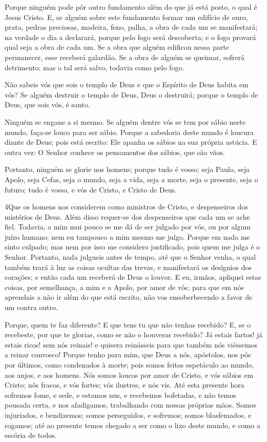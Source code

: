 Porque ninguém pode pôr outro fundamento além do que já está
posto, o qual é Jesus Cristo. E, se alguém sobre este
fundamento formar um edifício de ouro, prata, pedras preciosas,
madeira, feno, palha, a obra de cada um se manifestará; na
verdade o dia a declarará, porque pelo fogo será descoberta; e o
fogo provará qual seja a obra de cada um. Se a obra que
alguém edificou nessa parte permanecer, esse receberá galardão.
Se a obra de alguém se queimar, sofrerá detrimento; mas o tal
será salvo, todavia como pelo fogo.

Não sabeis vós que sois o templo de Deus e que o Espírito de Deus
habita em vós? Se alguém destruir o templo de Deus, Deus o
destruirá; porque o templo de Deus, que sois vós, é santo.

Ninguém se engane a si mesmo. Se alguém dentre vós se tem por
sábio neste mundo, faça-se louco para ser sábio. Porque a
sabedoria deste mundo é loucura diante de Deus; pois está escrito:
Ele apanha os sábios na sua própria astúcia. E outra vez: O
Senhor conhece os pensamentos dos sábios, que são vãos.

Portanto, ninguém se glorie nos homens; porque tudo é vosso;
seja Paulo, seja Apolo, seja Cefas, seja o mundo, seja a
vida, seja a morte, seja o presente, seja o futuro; tudo é vosso,
e vós de Cristo, e Cristo de Deus.

\medskip

\lettrine{4} Que os homens nos considerem como ministros de
Cristo, e despenseiros dos mistérios de Deus. Além disso
requer-se dos despenseiros que cada um se ache fiel. Todavia, a
mim mui pouco se me dá de ser julgado por vós, ou por algum juízo
humano; nem eu tampouco a mim mesmo me julgo. Porque em nada me
sinto culpado; mas nem por isso me considero justificado, pois quem
me julga é o Senhor. Portanto, nada julgueis antes de tempo, até
que o Senhor venha, o qual também trará à luz as coisas ocultas das
trevas, e manifestará os desígnios dos corações; e então cada um
receberá de Deus o louvor. E eu, irmãos, apliquei estas coisas,
por semelhança, a mim e a Apolo, por amor de vós; para que em nós
aprendais a não ir além do que está escrito, não vos ensoberbecendo
a favor de um contra outro.

Porque, quem te faz diferente? E que tens tu que não tenhas
recebido? E, se o recebeste, por que te glorias, como se não o
houveras recebido? Já estais fartos! já estais ricos! sem nós
reinais! e quisera reinásseis para que também nós viéssemos a reinar
convosco! Porque tenho para mim, que Deus a nós, apóstolos, nos
pôs por últimos, como condenados à morte; pois somos feitos
espetáculo ao mundo, aos anjos, e aos homens. Nós somos
loucos por amor de Cristo, e vós sábios em Cristo; nós fracos, e vós
fortes; vós ilustres, e nós vis. Até esta presente hora
sofremos fome, e sede, e estamos nus, e recebemos bofetadas, e não
temos pousada certa, e nos afadigamos, trabalhando com nossas
próprias mãos. Somos injuriados, e bendizemos; somos perseguidos, e
sofremos; somos blasfemados, e rogamos; até ao presente temos
chegado a ser como o lixo deste mundo, e como a escória de todos.

